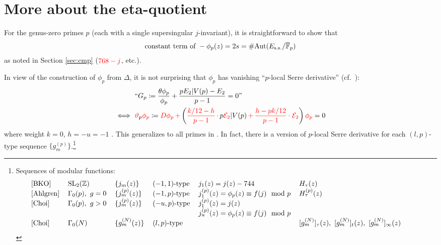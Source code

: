 \documentclass{rs}
\theoremstyle{definition}
\theoremstyle{remark}
\newcommand{\mb}[1]{\mathbb{#1}}
\newcommand{\Aut}{{\rm Aut}}
\newcommand{\cF}{\overline {\mb F}}
\newcommand{\CE}{{\cal E}}
\newcommand{\BZ}{{\mb Z}}
\newcommand{\md}{~~{\rm mod}~}
\renewcommand{\D}{\Delta}
\newcommand{\G}{\Gamma}
\newcommand{\ce}{\coloneqq}
\renewcommand{\=}{\approx}
\renewcommand{\-}{\sim}
\newcommand{\rd}[1]{{\textcolor{red}{#1}}}
\newcommand{\SL}{{\rm SL}}
\numberwithin{equation}{section}
\begin{document}
\section{More about the eta-quotient}

For the genus-zero primes $p$ (each with a single supersingular $j$-invariant), it is straightforward to show that 
\[
 \text{constant term of} ~ -\phi_p(z) = 2 s = \# \Aut(E_\text{s.s.}/\cF_p) 
\]
as noted in Section \ref{sec:cmp} ($\rd{768-j}$, etc.).  

In view of the construction of $\phi_p$ from $\D$, 
it is not surprising that $\phi_p$ has vanishing ``$p$-local Serre derivative'' \cite[Section 4]{Ahlgren} (cf.~\cite[(4.10)]{ho}): 
\[
 \begin{split}
       & ~ \text{``$G_p \ce \frac{\theta \phi_p}{\phi_p} + \frac{p E_2 | V(p) - E_2}{p - 1} = 0$''} \\
  \iff & ~ \rd{\vartheta}_p \rd{\phi_p} \ce \rd{D\phi_p \, +} \left( \rd{\frac{k / 12 - h}{p - 1} \, \cdot \,} p \rd{\CE_2} | V(p) 
           \rd{\, + \, \frac{h - p k / 12}{p - 1} \cdot \CE_2} \right) \rd{\phi_p} = 0 
 \end{split}
\]
where weight $k = 0$, $h = -u = -1$ \cite[Lemma 2.2]{Ahlgren}.  
This generalizes to all primes in \cite[Theorem 3.4]{Choi}.  
In fact, there is a version of $p$-local Serre derivative for each $(l,p)$-type sequence $\{g_m^{(p)}\}$.\footnote{Sequences of modular functions: 
\[
 \hskip -1cm
 \begin{tabular}{llllll}
  \cite{BKO}                  & $\SL_2(\BZ)$       & $\{j_m(z)\}$       & $(-1,1)$-type & $j_1(z) = j(z) - 744$                        & $H_\tau(z)$ \\
  \cite{Ahlgren}              & $\G_0(p), ~ g = 0$ & $\{j_m^{(p)}(z)\}$ & $(-1,p)$-type & $j_1^{(p)}(z) = \phi_p(z) \equiv f(j) \md p$ & $H_\tau^{(p)}(z)$ \\
  \cite[(2.4)]{Choi}          & $\G_0(p), ~ g > 0$ & $\{j_m^{(p)}(z)\}$ & $(-u,p)$-type & $j_1^{(p)}(z) = j(z)$                        & \\
                              &                    &                    &               & $j_u^{(p)}(z) = \phi_p(z) \equiv f(j) \md p$ & \\
  \cite[Definition 3.1]{Choi} & $\G_0(N)$          & $\{g_m^{(N)}(z)\}$ & $(l,p)$-type  &                                              & $[g_m^{(N)}]_\tau(z), ~ [g_m^{(N)}]_t(z), ~ [g_m^{(N)}]_\infty(z)$  
 \end{tabular}
\]
}
\end{document}
